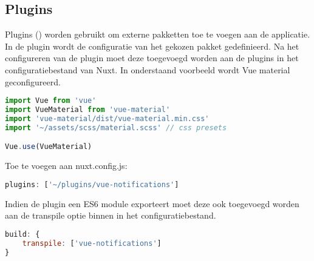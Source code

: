 \subsection{Plugins}
Plugins (\cite{NUXT_PLUGINS}) worden gebruikt om externe pakketten toe te voegen aan de applicatie. In de plugin wordt de configuratie van het gekozen pakket gedefinieerd. Na het configureren van de plugin moet deze toegevoegd worden aan de plugins in het configuratiebestand van Nuxt. In onderstaand voorbeeld wordt Vue material geconfigureerd.

\begin{lstlisting}[caption=Vue material plugin, language=Javascript]
import Vue from 'vue'
import VueMaterial from 'vue-material'
import 'vue-material/dist/vue-material.min.css'
import '~/assets/scss/material.scss' // css presets

Vue.use(VueMaterial)
\end{lstlisting}

Toe te voegen aan nuxt.config.js:

\begin{lstlisting}[caption= Plugin toevoegen aan nuxt.config.js, language=Javascript]
plugins: ['~/plugins/vue-notifications']
\end{lstlisting}

Indien de plugin een ES6 module exporteert moet deze ook toegevoegd worden aan de transpile optie binnen in het configuratiebestand.

\begin{lstlisting}[caption= Plugin toevoegen aan nuxt.config.js transpile, language=Javascript]
build: {
	transpile: ['vue-notifications']
}
\end{lstlisting}